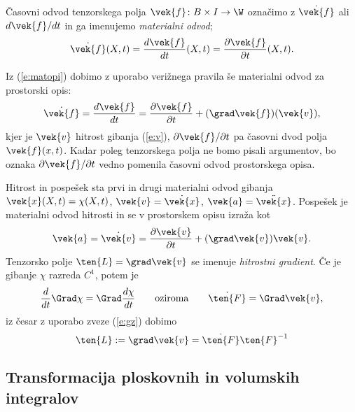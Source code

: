 \begin{definicija}
	Časovni odvod tenzorskega polja $\vek{f}\colon B\times I\to\W$ označimo z
	$\dot{\vek{f}}$ ali $d\vek{f}/dt$ in ga imenujemo \emph{materialni odvod};
	\[ \dot{\vek{f}}(X,t)=\frac{d\vek{f}}{dt}(X,t)=\frac{\partial\vek{f}}{\partial t}(X,t). \]
\end{definicija}
Iz (\ref{e:matopi}) dobimo z uporabo verižnega pravila še materialni odvod za prostorski opis:
\begin{equation} \label{e:matodv}
	\dot{\vek{f}}=\frac{d\vek{f}}{dt}=
	\frac{\partial\vek{f}}{\partial t}+(\grad\vek{f})(\vek{v}),
\end{equation}
kjer je $\vek{v}$ hitrost gibanja (\ref{e:v}), $\partial\vek{f}/\partial t$ pa
časovni dvod polja $\vek{f}(x,t)$. Kadar poleg tenzorskega polja ne bomo pisali argumentov,
bo oznaka $\partial\vek{f}/\partial t$ vedno pomenila časovni odvod prostorskega opisa.

\begin{primer} %
	Hitrost in pospešek sta prvi in drugi materialni odvod gibanja $\vek{x}(X,t)=\chi(X,t)$,
	$\vek{v}=\dot{\vek{x}}$, $\vek{a}=\ddot{\vek{x}}$.
	Pospešek je materialni odvod hitrosti in se v prostorskem opisu izraža kot
	\[ \vek{a}=\dot{\vek{v}}=\frac{\partial\vek{v}}{\partial t}+(\grad\vek{v})\vek{v}. \]
	Tenzorsko polje $\ten{L}=\grad\vek{v}$ se imenuje \emph{hitrostni gradient}.
	Če je gibanje $\chi$ razreda $C^1$, potem je
	\[
		\frac{d}{dt}\Grad\chi=\Grad\frac{d\chi}{dt}\qquad\textrm{oziroma}\qquad
		\dot{\ten{F}}=\Grad\vek{v},
	\]
	iz česar z uporabo zveze (\ref{e:gz}) dobimo
	\begin{equation} \label{e:L}
		\ten{L}:=\grad\vek{v}=\dot{\ten{F}}\ten{F}^{-1}
	\end{equation}
\end{primer}


\subsection{Transformacija ploskovnih in volumskih integralov}


